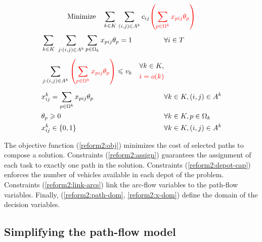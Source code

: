 \documentclass{article}
\begin{document}
\noindent
\begin{minipage}{\linewidth}
\begin{align}
   \mathrm{Minimize~~~}\sum_{k \in K} \, \sum_{(i,j) \in A^k} c_{ij} \textcolor{red}{\left(\sum_{p \in \Omega^k} x_{pij} \theta_p \right)} \label{reform2:obj}
\end{align}
\begin{align}
   & \sum_{k \in K} \,\, \sum_{j:(i,j) \in A^k}  \sum_{p \in \Omega_k} x_{pij} \theta_p = 1 & & \forall i \in T  \label{reform2:assign}\\[4pt]
   & \sum_{j : (i, j) \in A^k} \textcolor{red}{\left( \sum_{p \in \Omega^k} x_{pij} \theta_p \right)} \leqslant v_k &
   \begin{split}
      & \forall k \in K, \\
      & \textcolor{red}{i = o(k)}\\
   \end{split}  \label{reform2:depot-cap}\\[6pt]
   & x^k_{ij} = \sum_{p \in \Omega^k} x_{pij} \theta_p & &  \forall k \in K, (i,j) \in A^k  \label{reform2:link-arcs}\\
   & \theta_p \geqslant 0 & & \forall k \in K, p \in \Omega_k \label{reform2:path-dom}\\
   & x^k_{ij} \in \{0,1\} & & \forall k \in K, (i,j) \in A^k \label{reform2:x-dom}
\end{align}
\end{minipage}

\vspace*{12pt}

The objective function (\ref{reform2:obj}) minimizes the cost of selected paths to compose a solution.  Constraints (\ref{reform2:assign}) guarantees the assignment of each task to exactly one path in the solution. Constraints (\ref{reform2:depot-cap}) enforces the number of vehicles available in each depot of the problem. Constraints (\ref{reform2:link-arcs}) link the arc-flow variables to the path-flow variables. Finally, (\ref{reform2:path-dom}, \ref{reform2:x-dom}) define the domain of the decision variables.

\subsection{Simplifying the path-flow model}
\end{document}
